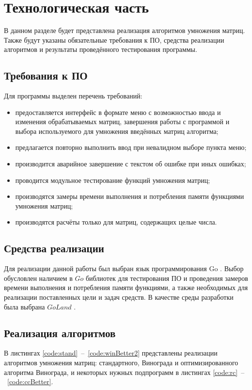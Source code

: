 \chapter{Технологическая часть}

В данном разделе будет представлена реализация алгоритмов умножения матриц. Также будут указаны обязательные требования к ПО, средства реализации алгоритмов и результаты проведённого тестирования программы.

\section{Требования к ПО}
Для программы выделен перечень требований:
\begin{itemize}
	\item предоставляется интерфейс в формате меню с возможностью ввода и изменения обрабатываемых матриц, завершения работы с программой и выбора используемого для умножения введённых матриц алгоритма;
	\item предлагается повторно выполнить ввод при невалидном выборе пункта меню;
	\item производится аварийное завершение с текстом об ошибке при иных ошибках;
	\item проводится модульное тестирование функций умножения матриц;
	\item производятся замеры времени выполнения и потребления памяти функциями умножения матриц;
	\item производятся расчёты только для матриц, содержащих целые числа.
\end{itemize}

\section{Средства реализации}
Для реализации данной работы был выбран язык программирования Go \cite{web_item2}. Выбор обусловлен наличием в $Go$ библиотек для тестирования ПО и проведения замеров времени выполнения и потребления памяти функциями, а также необходимых для реализации поставленных цели и задач средств. В качестве среды разработки была выбрана $GoLand$ \cite{web_item4}.

\section{Реализация алгоритмов}
В листингах \ref{code:stand}~--~\ref{code:winBetter2} представлены реализации алгоритмов умножения матриц: стандартного, Винограда и оптимизированного алгоритма Винограда, и некоторых нужных подпрограмм в листингах \ref{code:rc}~--~\ref{code:ccBetter}. 

